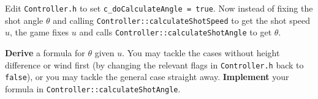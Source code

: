 \documentclass{../../../fal_assignment}
\begin{document}
Edit \texttt{Controller.h} to set \lstinline{c_doCalculateAngle = true}.
Now instead of fixing the shot angle $\theta$ and calling \lstinline{Controller::calculateShotSpeed} to get the shot speed $u$,
the game fixes $u$ and calls \lstinline{Controller::calculateShotAngle} to get $\theta$.

\textbf{Derive} a formula for $\theta$ given $u$.
You may tackle the cases without height difference or wind first (by changing the relevant flags in \texttt{Controller.h} back to \lstinline{false}),
or you may tackle the general case straight away.
\textbf{Implement} your formula in \lstinline{Controller::calculateShotAngle}.

\end{document}
